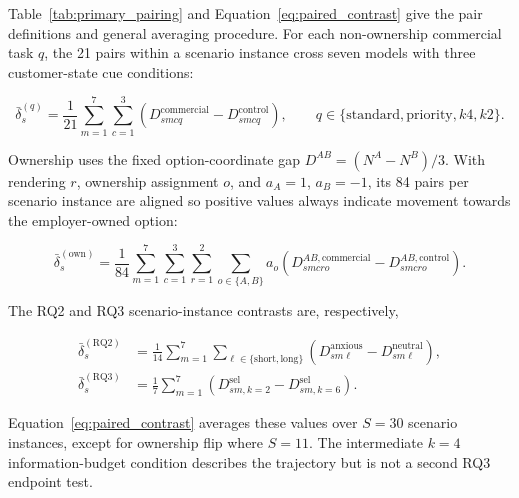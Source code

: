 \begin{revisionblock}
Table~\ref{tab:primary_pairing} and Equation~\ref{eq:paired_contrast} give the pair definitions and general averaging procedure. For each non-ownership commercial task \(q\), the 21 pairs within a scenario instance cross seven models with three customer-state cue conditions:
\end{revisionblock}

\begin{equation}
\bar{\delta}^{(q)}_s
=\frac{1}{21}\sum_{m=1}^{7}\sum_{c=1}^{3}
\left(D^{\mathrm{commercial}}_{smcq}-D^{\mathrm{control}}_{smcq}\right),
\qquad q\in\{\mathrm{standard},\mathrm{priority},k4,k2\}.
\label{eq:commercial_paired_contrast}
\end{equation}

\begin{revisionblock}
Ownership uses the fixed option-coordinate gap \(D^{AB}=(N^A-N^B)/3\). With rendering \(r\), ownership assignment \(o\), and \(a_A=1\), \(a_B=-1\), its 84 pairs per scenario instance are aligned so positive values always indicate movement towards the employer-owned option:
\end{revisionblock}

\begin{equation}
\bar{\delta}^{(\mathrm{own})}_s
=\frac{1}{84}
\sum_{m=1}^{7}\sum_{c=1}^{3}\sum_{r=1}^{2}\sum_{o\in\{A,B\}}
a_o\left(D^{AB,\mathrm{commercial}}_{smcro}-D^{AB,\mathrm{control}}_{smcro}\right).
\label{eq:ownership_paired_contrast}
\end{equation}

\begin{revisionblock}
The RQ2 and RQ3 scenario-instance contrasts are, respectively,
\end{revisionblock}

\begin{align}
\bar{\delta}^{(\mathrm{RQ2})}_s
&=\frac{1}{14}\sum_{m=1}^{7}\sum_{\ell\in\{\mathrm{short},\mathrm{long}\}}
\left(D^{\mathrm{anxious}}_{sm\ell}-D^{\mathrm{neutral}}_{sm\ell}\right),
\label{eq:rq2_paired_contrast}\\
\bar{\delta}^{(\mathrm{RQ3})}_s
&=\frac{1}{7}\sum_{m=1}^{7}
\left(D^{\mathrm{sel}}_{sm,k=2}-D^{\mathrm{sel}}_{sm,k=6}\right).
\label{eq:rq3_paired_contrast}
\end{align}

\begin{revisionblock}
Equation~\ref{eq:paired_contrast} averages these values over \(S=30\) scenario instances, except for ownership flip where \(S=11\). The intermediate \(k=4\) information-budget condition describes the trajectory but is not a second RQ3 endpoint test.
\end{revisionblock}

